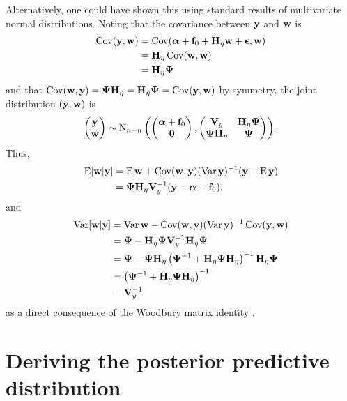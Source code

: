 Alternatively, one could have shown this using standard results of multivariate normal distributions.
Noting that the covariance between $\by$ and $\bw$ is  %
\begin{align*}
  \Cov(\by,\bw) 
  &= \Cov(\balpha + \bff_0 + \bH_\eta\bw + \bepsilon, \bw) \\
  &= \bH_\eta\Cov(\bw,\bw) \\
  &= \bH_\eta\bPsi 
\end{align*}
and that $\Cov(\bw,\by) = \bPsi\bH_\eta = \bH_\eta\bPsi = \Cov(\by,\bw)$ by symmetry, the joint distribution $(\by,\bw)$ is
\[
  \begin{pmatrix}
    \by \\
    \bw
  \end{pmatrix}
  \sim \N_{n+n}
  \left(
    \begin{pmatrix}
      \balpha + \bff_0 \\
      \bzero
    \end{pmatrix},
    \begin{pmatrix}
      \bV_y         & \bH_\eta\bPsi \\
      \bPsi\bH_\eta & \bPsi \\
    \end{pmatrix}
  \right).
\] 
Thus,
\begin{align*}
  \E [\bw|\by] 
  &= \E \bw + \Cov(\bw,\by) (\Var \by)^{-1} (\by - \E \by) \\
  &= \bPsi\bH_\eta\bV_y^{-1}(\by - \balpha - \bff_0),
\end{align*}
and
\begin{align*}
  \Var [\bw|\by] 
  &= \Var \bw - \Cov(\bw,\by) (\Var \by)^{-1} \Cov(\by,\bw) \\
  &= \bPsi - \bH_\eta\bPsi\bV_y^{-1}\bH_\eta\bPsi \\
  &= \bPsi - \bPsi\bH_\eta \left(\bPsi^{-1} + \bH_\eta\bPsi\bH_\eta \right)^{-1}\bH_\eta\bPsi  \\
  &= \left(\bPsi^{-1} + \bH_\eta\bPsi\bH_\eta \right)^{-1} \\
  &= \bV_y^{-1}
\end{align*}
as a direct consequence of the Woodbury matrix identity \citep[eq. (156), §3.2.2]{petersen2008matrix}.

\section{Deriving the posterior predictive distribution}
\label{apx:postpred}

